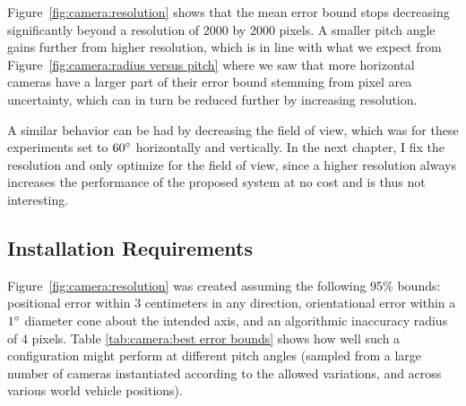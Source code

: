 \documentclass[a4paper,12pt,twoside,openright]{report}
\begin{document}
Figure~\ref{fig:camera:resolution} shows that the mean error bound stops decreasing
significantly beyond a resolution of 2000 by 2000 pixels. A smaller pitch 
angle gains further from higher resolution, which is in line with what we 
expect from Figure~\ref{fig:camera:radius versus pitch} where we saw that more horizontal cameras
have a larger part of their error bound stemming from pixel area uncertainty,
which can in turn be reduced further by increasing resolution.

A similar behavior can be had by decreasing the field of view, which was for
these experiments set to $60\degree$ horizontally and vertically. 
In the next chapter, I fix the resolution and only optimize for the field of view,
since a higher resolution always increases the performance
of the proposed system at no cost and is thus not interesting.

\subsection{Installation Requirements}

Figure~\ref{fig:camera:resolution} was created assuming the following 95\% bounds: positional error
within 3 centimeters in any direction, orientational error within a
$1\degree$ diameter cone about the intended axis, 
and an algorithmic inaccuracy radius of 4 pixels. Table \ref{tab:camera:best error bounds}
shows how well such a configuration might perform at different pitch angles (sampled from
a large number of cameras instantiated according to the allowed variations,
and across various world vehicle positions). 

\end{document}
